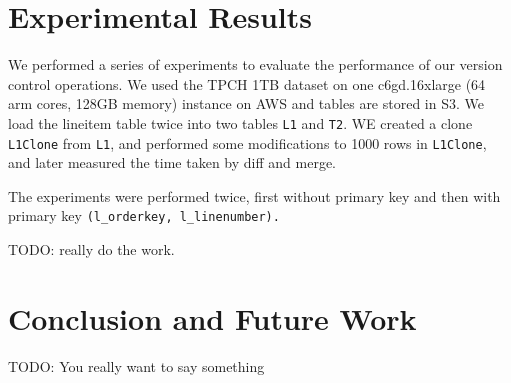 \documentclass[sigconf,nonacm]{acmart} %
\begin{document}
\section{Experimental Results}
We performed a series of experiments to evaluate the performance of 
our version control operations.  We used the TPCH 1TB dataset on one 
c6gd.16xlarge (64 arm cores, 128GB memory) instance on AWS and tables 
are stored in S3.  We load the lineitem table twice into two tables 
\texttt{L1} and \texttt{T2}.  WE created a clone \texttt{L1Clone} 
from \texttt{L1}, and performed some modifications to 1000 rows in 
\texttt{L1Clone}, and later measured the time taken by diff and merge.

The experiments were performed twice, first without primary key and
then with primary key \texttt{(l\_orderkey, l\_linenumber).}

TODO: really do the work.

\section{Conclusion and Future Work}

TODO: You really want to say something


\end{document}
